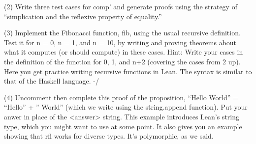 \documentclass[letterpaper,10pt,english]{sphinxmanual}
\begin{document}
(2) Write three test cases for comp’ and generate proofs using the
strategy of “simplication and the reflexive property of equality.”

\begin{sphinxVerbatim}[commandchars=\\\{\}]
       
       
       
\end{sphinxVerbatim}

(3) Implement the Fibonacci function, fib, using the usual recursive
definition. Test it for n = 0, n = 1, and n = 10, by writing and
proving theorems about what it computes (or should compute) in these
cases. Hint: Write your cases in the definition of the function for 0,
1, and n+2 (covering the cases from 2 up). Here you get practice
writing recursive functions in Lean. The syntax is similar to that of
the Haskell language.  -/

\begin{sphinxVerbatim}[commandchars=\\\{\}]
    
   
   
       

       
       
       
\end{sphinxVerbatim}

(4) Uncomment then complete this proof of the
proposition, “Hello World” = “Hello” + ” World”
(which we write using the string.append function).
Put your anwer in place of the \textless{}answer\textgreater{} string.
This example introduces Lean’s string type, which
you might want to use at some point. It also gives
you an example showing that rfl works for diverse
types. It’s polymorphic, as we said.
\end{document}

